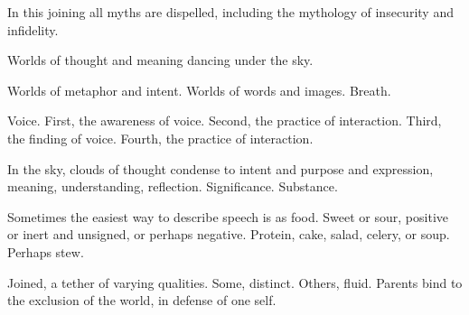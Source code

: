

﻿In this joining all myths are dispelled, including the mythology of
insecurity and infidelity.

Worlds of thought and meaning dancing under the sky.

Worlds of metaphor and intent.  Worlds of words and images.  Breath.

Voice.  First, the awareness of voice.  Second, the practice of
interaction.  Third, the finding of voice. \break Fourth, the practice
of interaction.

In the sky, clouds of thought condense to intent and purpose and
expression, meaning, understanding, reflection.  Significance.
Substance.

Sometimes the easiest way to describe speech is as food.  Sweet or
sour, positive or inert and unsigned, or perhaps negative.  Protein,
cake, salad, celery, or soup.  Perhaps stew.

Joined, a tether of varying qualities.  Some, distinct.  Others,
fluid.  Parents bind to the exclusion of the world, in defense of one
self.

\bye
